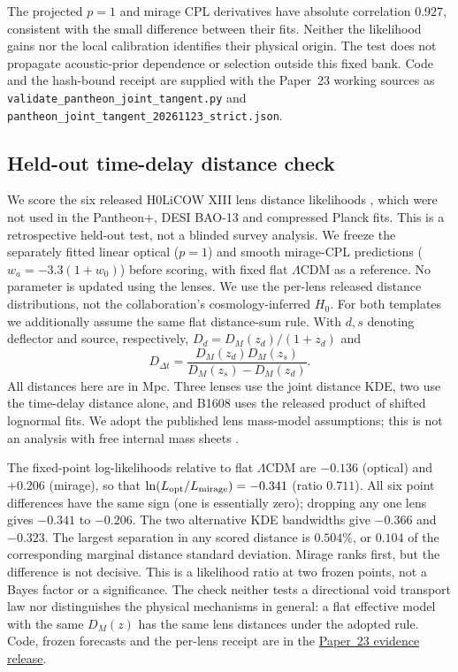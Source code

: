 \documentclass[11pt,a4paper]{article}
\begin{document}
The projected $p=1$ and mirage CPL derivatives have absolute
correlation $0.927$, consistent with the small difference between
their fits. Neither the likelihood gains nor the local calibration
identifies their physical origin. The test does not propagate
acoustic-prior dependence or selection outside this fixed bank.
Code and the hash-bound receipt are supplied with the Paper~23
working sources as \texttt{validate\_pantheon\_joint\_tangent.py}
and \texttt{pantheon\_joint\_tangent\_20261123\_strict.json}.

\subsection{Held-out time-delay distance check}
\label{sec:heldout-lens}
We score the six released H0LiCOW XIII lens distance likelihoods
\cite{Wong2020H0LiCOW}, which were not used in the Pantheon+,
DESI BAO-13 and compressed Planck fits. This is a retrospective
held-out test, not a blinded survey analysis. We freeze the separately
fitted linear optical ($p=1$) and smooth mirage-CPL predictions
($w_a=-3.3(1+w_0)$) before scoring, with fixed flat $\Lambda$CDM
as a reference. No parameter is updated using the lenses. We use the
per-lens released distance distributions, not the collaboration's
cosmology-inferred $H_0$.
For both templates we additionally assume the same flat
distance-sum rule. With $d,s$ denoting deflector and source,
respectively, $D_d=D_M(z_d)/(1+z_d)$ and
\[
 D_{\Delta t}=\frac{D_M(z_d)D_M(z_s)}{D_M(z_s)-D_M(z_d)}.
\]
All distances here are in Mpc. Three lenses use the joint distance KDE,
two use the time-delay distance alone, and B1608 uses the released
product of shifted lognormal fits. We adopt the published lens mass-model
assumptions; this is not an analysis with free internal mass sheets
\cite{Birrer2020TDCOSMO}.

The fixed-point log-likelihoods relative to flat $\Lambda$CDM are
$-0.136$ (optical) and $+0.206$ (mirage), so that
$\ln(L_{\rm opt}/L_{\rm mirage})=-0.341$ (ratio $0.711$).
All six point differences have the same sign (one is essentially zero);
dropping any one lens gives $-0.341$ to $-0.206$. The two alternative KDE
bandwidths give $-0.366$ and $-0.323$. The largest separation in any
scored distance is $0.504\%$, or $0.104$ of the corresponding marginal
distance standard deviation. Mirage ranks first, but the difference is
not decisive. This is a likelihood ratio at two frozen points, not a
Bayes factor or a significance. The check neither tests a directional
void transport law nor distinguishes the physical mechanisms in
general: a flat effective model with the same $D_M(z)$ has the same
lens distances under the adopted rule. Code, frozen forecasts and the
per-lens receipt are in the \href{https://github.com/tau-core-research/tau-core-void-clocks-des2026-galactic-dip-paper23/releases/tag/v15.1-lens-holdout}{Paper~23 evidence release}.
\end{document}
